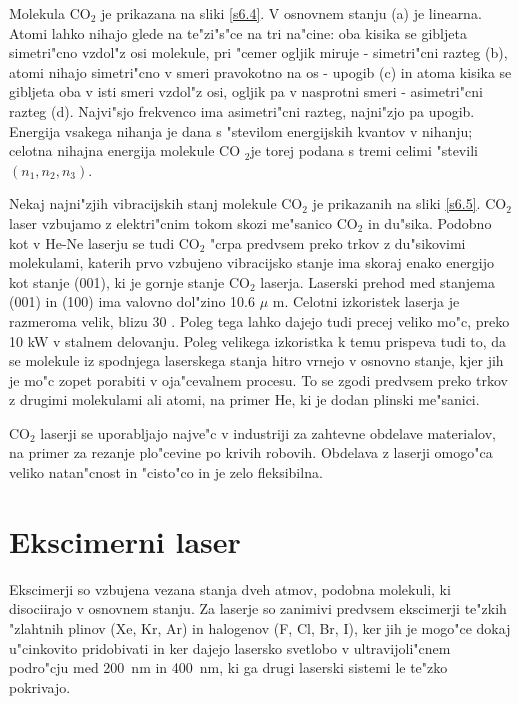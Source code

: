 Molekula CO$_2$ je prikazana na sliki \ref{s6.4}. V osnovnem stanju (a) je
linearna. Atomi lahko nihajo glede na te"zi"s"ce na tri na"cine: oba kisika
se gibljeta simetri"cno vzdol"z osi molekule, pri "cemer ogljik miruje -
simetri"cni razteg (b), atomi nihajo simetri"cno v smeri pravokotno na os -
upogib (c) in atoma kisika se gibljeta oba v isti smeri vzdol"z osi, ogljik
pa v nasprotni smeri - asimetri"cni razteg (d). Najvi"sjo frekvenco ima
asimetri"cni razteg, najni"zjo pa upogib. Energija vsakega nihanja je dana s
"stevilom energijskih kvantov v nihanju; celotna nihajna energija molekule CO%
$_2$je torej podana s tremi celimi "stevili $(n_1,n_2,n_3)$.

Nekaj najni"zjih vibracijskih stanj molekule CO$_2$ je prikazanih na sliki 
\ref{s6.5}. CO$_2$ laser vzbujamo z elektri"cnim tokom skozi me"sanico CO$_2$
in du"sika. Podobno kot v He-Ne laserju se tudi CO$_2$ "crpa predvsem preko
trkov z du"sikovimi molekulami, katerih prvo vzbujeno vibracijsko stanje ima
skoraj enako energijo kot stanje (001), ki je gornje stanje CO$_2$ laserja.
Laserski prehod med stanjema (001) in (100) ima valovno dol"zino 10.6 $\mu$%
m. Celotni izkoristek laserja je razmeroma velik, blizu 30%
. Poleg tega lahko dajejo tudi precej veliko mo"c, preko
10 kW v stalnem delovanju. Poleg velikega izkoristka k temu prispeva tudi
to, da se molekule iz spodnjega laserskega stanja hitro vrnejo v osnovno
stanje, kjer jih je mo"c zopet porabiti v oja"cevalnem procesu. To se zgodi
predvsem preko trkov z drugimi molekulami ali atomi, na primer He, ki je
dodan plinski me"sanici.

CO$_2$ laserji se uporabljajo najve"c v industriji za zahtevne obdelave
materialov, na primer za rezanje plo"cevine po krivih robovih. Obdelava z
laserji omogo"ca veliko natan"cnost in "cisto"co in je zelo fleksibilna.

\section{Ekscimerni laser}

Ekscimerji so vzbujena vezana stanja dveh atmov, podobna molekuli, ki
disociirajo v osnovnem stanju. Za laserje so zanimivi predvsem ekscimerji
te"zkih "zlahtnih plinov (Xe, Kr, Ar) in halogenov (F, Cl, Br, I), ker jih
je mogo"ce dokaj u"cinkovito pridobivati in ker dajejo lasersko svetlobo v
ultravijoli"cnem podro"cju med 200~nm in 400~nm, ki ga drugi laserski
sistemi le te"zko pokrivajo.

